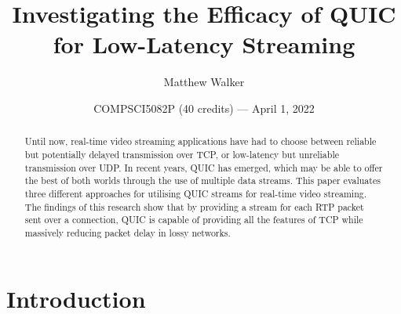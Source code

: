 \documentclass{mpaper}
\begin{document}
\title{Investigating the Efficacy of QUIC for Low-Latency Streaming}
\author{Matthew Walker}
\date{COMPSCI5082P (40 credits) — April 1, 2022}

\maketitle

\begin{abstract}
Until now, real-time video streaming applications have had to choose between reliable but potentially delayed transmission over TCP, or low-latency but unreliable transmission over UDP. In recent years, QUIC has emerged, which may be able to offer the best of both worlds through the use of multiple data streams. This paper evaluates three different approaches for utilising QUIC streams for real-time video streaming. The findings of this research show that by providing a stream for each RTP packet sent over a connection, QUIC is capable of providing all the features of TCP while massively reducing packet delay in lossy networks.
\end{abstract}

\section{Introduction} \label{Introduction}
\end{document}
